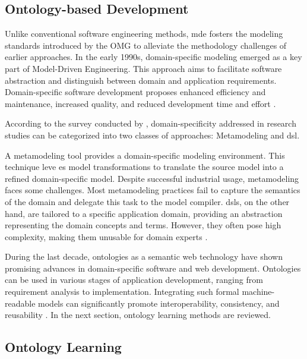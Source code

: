\vspace{-10pt}
\hypertarget{sec:related-work.onto}{%
\subsection{Ontology-based Development}\label{sec:related-work.onto}}
\vspace{10pt}

Unlike conventional software engineering methods, \gls{mde} fosters the modeling standards introduced by the OMG to
alleviate the methodology challenges of earlier approaches. In the early
1990s, domain-specific modeling emerged as a key part of Model-Driven
Engineering. This approach aims to facilitate software abstraction and
distinguish between domain and application requirements.
Domain-specific software development proposes enhanced efficiency and
maintenance, increased quality, and reduced development time and effort
\autocite{Jacobson2017}.

According to the survey conducted by \autocite{Zafar2024}, 
domain-specificity addressed in research studies can be categorized into
two classes of approaches: Metamodeling and \gls{dsl}.

A metamodeling tool provides a domain-specific modeling environment.
This technique leve es model transformations to translate the
source model into a refined domain-specific model. Despite successful
industrial usage, metamodeling faces some challenges. Most metamodeling
practices fail to capture the semantics of the domain and delegate this
task to the model compiler. \gls{dsl}s, on the other hand, are tailored to a
specific application domain, providing an abstraction representing the
domain concepts and terms. However, they often pose high complexity,
making them unusable for domain experts \autocite{Sosa2011}.

During the last decade, ontologies as a semantic web technology have
shown promising advances in domain-specific software and web
development. Ontologies can be used in various stages of application
development, ranging from requirement analysis to implementation.
Integrating such formal machine-readable models can significantly
promote interoperability, consistency, and reusability \autocite{Chhaya2020}. 
In the next section, ontology learning methods are reviewed.

\vspace{-10pt}
\hypertarget{sec:related-work.onto-learning}{%
\subsection{Ontology Learning}\label{sec:related-work.onto-learning}}
\vspace{10pt}

